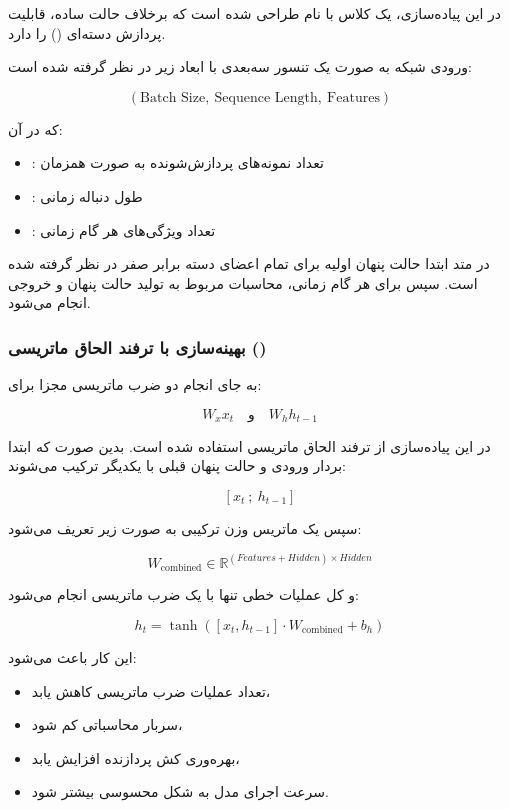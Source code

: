 \documentclass{article}
\begin{document}
در این پیاده‌سازی، یک کلاس با نام  طراحی شده است که برخلاف حالت ساده، قابلیت پردازش دسته‌ای () را دارد.

ورودی شبکه به صورت یک تنسور سه‌بعدی با ابعاد زیر در نظر گرفته شده است:

\[
(\text{Batch Size},\ \text{Sequence Length},\ \text{Features})
\]

که در آن:

\begin{itemize}
	\item {}: تعداد نمونه‌های پردازش‌شونده به صورت همزمان
	\item {}: طول دنباله زمانی
	\item {}: تعداد ویژگی‌های هر گام زمانی
\end{itemize}

در متد  ابتدا حالت پنهان اولیه برای تمام اعضای دسته برابر صفر در نظر گرفته شده است. سپس برای هر گام زمانی، محاسبات مربوط به تولید حالت پنهان و خروجی انجام می‌شود.

\subsubsection{بهینه‌سازی با ترفند الحاق ماتریسی ()}

به جای انجام دو ضرب ماتریسی مجزا برای:

\[
W_x x_t \quad \text{و} \quad W_h h_{t-1}
\]

در این پیاده‌سازی از ترفند الحاق ماتریسی استفاده شده است. بدین صورت که ابتدا بردار ورودی و حالت پنهان قبلی با یکدیگر ترکیب می‌شوند:

\[
[x_t \ ; \ h_{t-1}]
\]

سپس یک ماتریس وزن ترکیبی به صورت زیر تعریف می‌شود:

\[
W_{\text{combined}} \in \mathbb{R}^{(Features + Hidden)\times Hidden}
\]

و کل عملیات خطی تنها با یک ضرب ماتریسی انجام می‌شود:

\[
h_t = \tanh\left([x_t, h_{t-1}] \cdot W_{\text{combined}} + b_h \right)
\]

این کار باعث می‌شود:

\begin{itemize}
	\item تعداد عملیات ضرب ماتریسی کاهش یابد،
	\item سربار محاسباتی کم شود،
	\item بهره‌وری کش پردازنده افزایش یابد،
	\item سرعت اجرای مدل به شکل محسوسی بیشتر شود.
\end{itemize}
\end{document}
